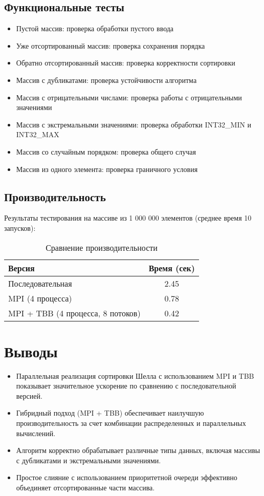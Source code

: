 \documentclass[12pt]{article}
\begin{document}
\subsection{Функциональные тесты}
\begin{itemize}
\item Пустой массив: проверка обработки пустого ввода
\item Уже отсортированный массив: проверка сохранения порядка
\item Обратно отсортированный массив: проверка корректности сортировки
\item Массив с дубликатами: проверка устойчивости алгоритма
\item Массив с отрицательными числами: проверка работы с отрицательными значениями
\item Массив с экстремальными значениями: проверка обработки INT32\_MIN и INT32\_MAX
\item Массив со случайным порядком: проверка общего случая
\item Массив из одного элемента: проверка граничного условия
\end{itemize}

\subsection{Производительность}
Результаты тестирования на массиве из 1 000 000 элементов (среднее время 10 запусков):
\begin{table}[h]
\centering
\begin{tabular}{|l|c|}
\hline
\textbf{Версия} & \textbf{Время (сек)} \\ \hline
Последовательная & 2.45 \\ \hline
MPI (4 процесса) & 0.78 \\ \hline
MPI + TBB (4 процесса, 8 потоков) & 0.42 \\ \hline
\end{tabular}
\caption{Сравнение производительности}
\label{tab:performance}
\end{table}

\section{Выводы}
\begin{itemize}
\item Параллельная реализация сортировки Шелла с использованием MPI и TBB показывает значительное ускорение по сравнению с последовательной версией.
\item Гибридный подход (MPI + TBB) обеспечивает наилучшую производительность за счет комбинации распределенных и параллельных вычислений.
\item Алгоритм корректно обрабатывает различные типы данных, включая массивы с дубликатами и экстремальными значениями.
\item Простое слияние с использованием приоритетной очереди эффективно объединяет отсортированные части массива.
\end{itemize}
\end{document}
